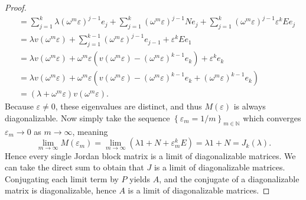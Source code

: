 \documentclass[11pt, letterpaper]{article}
\theoremstyle{plain}
\begin{document}
\begin{proof}
\begin{align*}
					      &=\sum_{j=1}^{k} \lambda (\omega ^m\varepsilon )^{j-1} e_j + \sum_{j=1}^{k} (\omega ^m\varepsilon )^{j-1} Ne_j + \sum_{j=1}^{k} (\omega ^m\varepsilon )^{j-1} \varepsilon ^kEe_j\\
					      &=\lambda v(\omega ^m\varepsilon )+\sum_{j=1}^{k-1} (\omega ^m\varepsilon)^{j-1} e_{j-1} +\varepsilon ^{k} Ee_1\\
					      &=\lambda v(\omega ^m\varepsilon )+\omega ^m\varepsilon \left(v(\omega ^m\varepsilon )-(\omega ^m\varepsilon)^{k-1} e_k\right) + \varepsilon ^ke_k\\
					      &=\lambda v(\omega ^m\varepsilon ) + \omega ^m\varepsilon \left(v(\omega ^m\varepsilon )-(\omega ^m\varepsilon )^{k-1} e_k + (\omega ^m\varepsilon )^{k-1} e_k\right)\\
					      &=(\lambda +\omega ^m\varepsilon )v(\omega ^m\varepsilon )
	.\end{align*}
	Because $\varepsilon \neq 0$, these eigenvalues are distinct, and thus $M(\varepsilon )$ is always diagonalizable. Now simply take the sequence $\left\{ \varepsilon _m = 1/m \right\}_{m\in\mathbb{N} } $ which converges $\varepsilon _m\to 0$ as $m\to \infty $, meaning
	\[
		\lim_{m\to \infty } M(\varepsilon _m)=\lim_{m\to \infty } \left( \lambda 1+N+\varepsilon_m^kE \right) =\lambda 1+N=J_k(\lambda )
	.\]
	Hence every single Jordan block matrix is a limit of diagonalizable matrices. We can take the direct sum to obtain that $J$ is a limit of diagonalizable matrices. Conjugating each limit term by $P$ yields $A$, and the conjugate of a diagonalizable matrix is diagonalizable, hence $A$ is a limit of diagonalizable matrices.
\end{proof}
\end{document}
